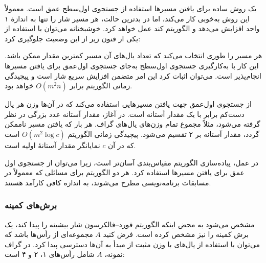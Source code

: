یک روش ساده برای یافتن مسیرها استفاده از جستجوی اول‌سطح عمق است.
معمولاً این روش به‌خوبی کار می‌کند، اما در بدترین حالت،
هر مسیر شار را تنها به اندازهٔ ۱ واحد افزایش می‌دهد
و الگوریتم کند عمل خواهد کرد.
خوشبختانه می‌توان با استفاده از
یکی از فنون زیر از این وضعیت جلوگیری کرد:


 \cite{edm72}
هر مسیر را طوری انتخاب می‌کند که تعداد یال‌های
آن مسیر کمترین مقدار ممکن باشد.
این کار با به‌کارگیری جستجوی اول‌سطح به‌جای
جستجوی اول‌عمق برای یافتن مسیرها انجام‌پذیر است.
می‌توان اثبات کرد این امر متضمن افزایش
سریع شار است و پیچیدگی زمانی
الگوریتم برابر $O(m^2 n)$ خواهد بود.


 \cite{ahu91} از جستجوی اول‌عمق
جهت یافتن مسیرهایی استفاده می‌کند که در آن‌ها وزن هر یال
دست‌کم برابر با یک مقدار آستانه است.
در آغاز، مقدار آستانه عدد بزرگی در نظر گرفته می‌شود،
مثلاً مجموع تمام وزن‌های یال‌های گراف.
هر بار که یافتن مسیر ناممکن گردد،
مقدار آستانه بر ۲ تقسیم می‌شود.
پیچیدگی زمانی الگوریتم $O(m^2 \log c)$ است
که در آن $c$ نمایانگر مقدار آستانهٔ اولیه است.

در عمل، پیاده‌سازی الگوریتم مقیاس‌بندی آسان‌تر است،
زیرا می‌توان از جستجوی اول عمق برای یافتن مسیرها استفاده کرد.
هر دو الگوریتم برای مسائلی که معمولاً در مسابقات برنامه‌نویسی مطرح می‌شوند،
به اندازه کافی کارآمد هستند.

\subsubsection{برش‌های کمینه}


مشخص می‌شود به محض اینکه الگوریتم فورد–فالکرسون
شار بیشینه را پیدا کند،
یک برش کمینه را نیز مشخص کرده است.
فرض کنید $A$ مجموعه‌ای از رأس‌ها باشد
که می‌توان با استفاده از یال‌های با وزن مثبت
از مبدأ به آن‌ها دسترسی پیدا کرد.
در گراف نمونه، $A$ شامل رأس‌های ۱، ۲ و ۴ است:

